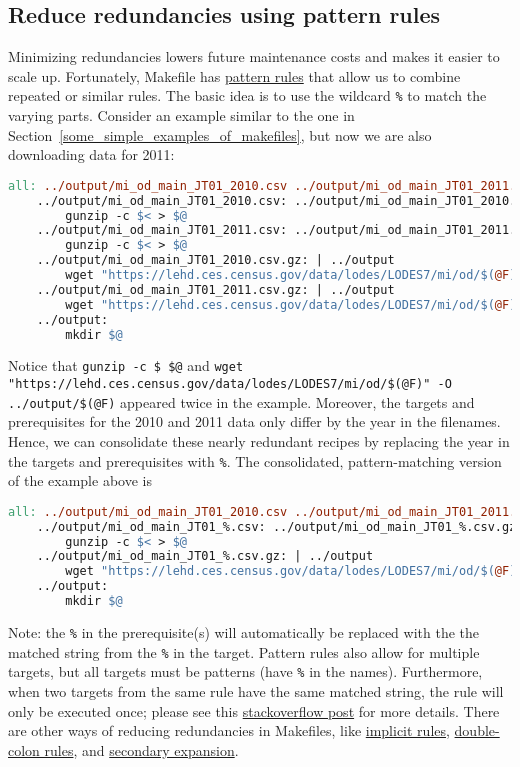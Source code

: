 \subsection{Reduce redundancies using pattern rules}
Minimizing redundancies lowers future maintenance costs and makes it easier to scale up.
Fortunately, Makefile has 
	\href{https://www.gnu.org/software/make/manual/html_node/Pattern-Rules.html}{pattern rules}
	that allow us to combine repeated or similar rules.
The basic idea is to use the wildcard \texttt{\%} to match the varying parts.
Consider an example similar to the one in Section~\ref{some_simple_examples_of_makefiles},
	but now we are also downloading data for 2011:
\begin{lstlisting}[language=make]
	all: ../output/mi_od_main_JT01_2010.csv ../output/mi_od_main_JT01_2011.csv
	../output/mi_od_main_JT01_2010.csv: ../output/mi_od_main_JT01_2010.csv.gz
		gunzip -c $< > $@
	../output/mi_od_main_JT01_2011.csv: ../output/mi_od_main_JT01_2011.csv.gz
		gunzip -c $< > $@
	../output/mi_od_main_JT01_2010.csv.gz: | ../output
		wget "https://lehd.ces.census.gov/data/lodes/LODES7/mi/od/$(@F)" -O ../output/$(@F)
	../output/mi_od_main_JT01_2011.csv.gz: | ../output
		wget "https://lehd.ces.census.gov/data/lodes/LODES7/mi/od/$(@F)" -O ../output/$(@F)
	../output:
		mkdir $@
\end{lstlisting}
Notice that \texttt{gunzip -c \$< > \$@}
	and \texttt{wget "https://lehd.ces.census.gov/data/lodes/LODES7/mi/od/\$(@F)" -O ../output/\$(@F)}
	appeared twice in the example.
Moreover, the targets and prerequisites for the 2010 and 2011 data
	only differ by the year in the filenames.
Hence, we can consolidate these nearly redundant recipes by replacing the year
	in the targets and prerequisites with \texttt{\%}.
The consolidated, pattern-matching version of the example above is
\begin{lstlisting}[language=make]
	all: ../output/mi_od_main_JT01_2010.csv ../output/mi_od_main_JT01_2011.csv
	../output/mi_od_main_JT01_%.csv: ../output/mi_od_main_JT01_%.csv.gz
		gunzip -c $< > $@
	../output/mi_od_main_JT01_%.csv.gz: | ../output
		wget "https://lehd.ces.census.gov/data/lodes/LODES7/mi/od/$(@F)" -O ../output/$(@F)
	../output:
		mkdir $@
\end{lstlisting}
Note: the \texttt{\%} in the prerequisite(s) will automatically be
	replaced with the the matched string from the \texttt{\%} in the target.
Pattern rules also allow for multiple targets,
	but all targets must be patterns
	(have \texttt{\%} in the names).
Furthermore, when two targets from the same rule have the same matched string,
	the rule will only be executed once;
	please see this
	\href{https://stackoverflow.com/questions/13945091/make-error-of-mixed-implicit-and-normal-rules}{stackoverflow post}
	for more details.
There are other ways of reducing redundancies in Makefiles,
	like \href{https://www.gnu.org/software/make/manual/html_node/Implicit-Rules.html#Implicit-Rules}{implicit rules},
	\href{https://www.gnu.org/software/make/manual/html_node/Double_002dColon.html}{double-colon rules},
	and \href{https://www.gnu.org/software/make/manual/html_node/Secondary-Expansion.html}{secondary expansion}.

